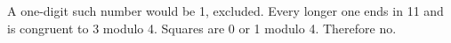 A one-digit such number would be 1, excluded. Every longer one ends in 11 and is congruent to 3 modulo 4. Squares are 0 or 1 modulo 4. Therefore $\boxed{\text{no}}$.
